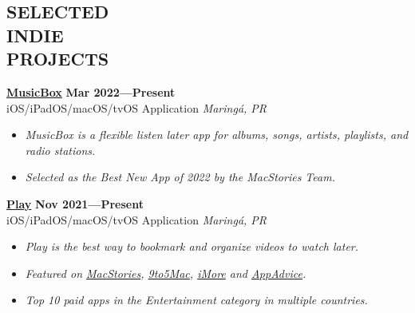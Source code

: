 \documentclass[line,margin]{res}
\begin{document}
\begin{resume}
\section{SELECTED \\ INDIE \\ PROJECTS}
  {\bf \href{https://apps.apple.com/us/app/id1614730313}{MusicBox}} \hfill {\bf Mar 2022---Present} \\
  iOS/iPadOS/macOS/tvOS Application \hfill {\sl Maring\'a, PR}\\[-6pt]
    \begin{itemize}
    \item {\sl MusicBox is a flexible listen later app for albums,  songs,  artists,  playlists,  and radio stations.}
    \item {\sl Selected as the Best New App of 2022 by the MacStories Team.}
    \end{itemize}

  {\bf \href{https://apps.apple.com/us/app/id1596506190}{Play}} \hfill {\bf Nov 2021---Present} \\
  iOS/iPadOS/macOS/tvOS Application \hfill {\sl Maring\'a, PR}\\[-6pt]
    \begin{itemize}
    \item {\sl Play is the best way to bookmark and organize videos to watch later.}
    \item {\sl Featured on \href{https://www.macstories.net/reviews/play-a-fantastic-utility-for-saving-and-organizing-youtube-videos-for-later/}{MacStories}, \href{https://9to5mac.com/2022/02/11/play-app-lets-you-access-youtube-videos-directly-from-your-home-screen/}{9to5Mac}, \href{https://www.imore.com/play-app-saving-youtube-videos-you-want-watch-later}{iMore} and \href{https://appadvice.com/post/bookmark-youtube-videos-to-watch-later-with-the-new-app-play/773234}{AppAdvice}.}
    \item {\sl Top 10 paid apps in the Entertainment category in multiple countries.}
    \end{itemize}
    

\end{resume}
\end{document}
